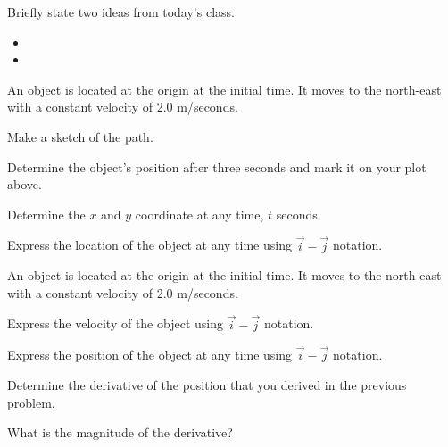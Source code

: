 \begin{problem}
\item Briefly state two ideas from today's class.
  \begin{itemize}
  \item 
  \item 
  \end{itemize}
\item An object is located at the origin at the initial time. It moves
  to the north-east with a constant velocity of 2.0 m/seconds. 

  \begin{subproblem}
  \item Make a sketch of the path.
    \vfill
  \item Determine the object's position after three seconds and mark
    it on your plot above.
    \vspace{4em}
  \item Determine the $x$ and $y$ coordinate at any time, $t$ seconds.
    \vfill
  \item Express the location of the object at any time using
    $\vec{i}-\vec{j}$ notation.
    \vspace{3em}
  \end{subproblem}

  \clearpage

\item An object is located at the origin at the initial time. It moves
  to the north-east with a constant velocity of 2.0 m/seconds. 

  \begin{subproblem}
  \item Express the velocity of the object using $\vec{i}-\vec{j}$
    notation.  
    \vfill
  \item Express the position of the object at any time using
    $\vec{i}-\vec{j}$ notation.
    \vfill
  \item Determine the derivative of the position that you derived in
    the previous problem.
    \vfill
  \item What is the magnitude of the derivative?
    \vfill
  \end{subproblem}


\end{problem}



